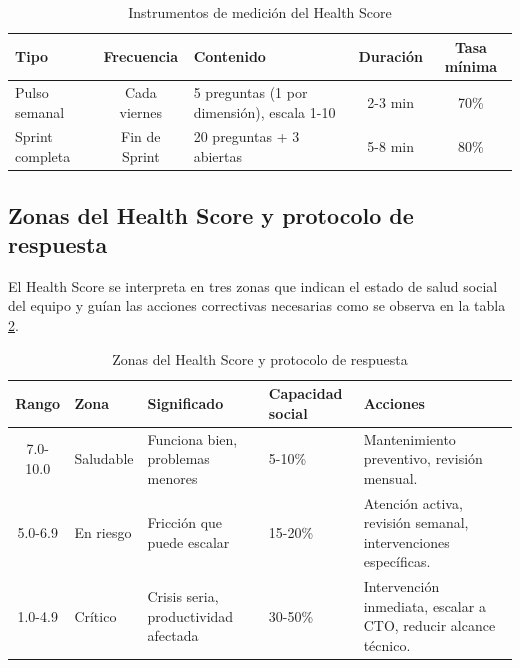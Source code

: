 \begin{table}[h]
    \centering
    \small
    \begin{tabularx}{\textwidth}{|l|c|X|c|c|}
        \hline
        \textbf{Tipo}   & \textbf{Frecuencia} & \textbf{Contenido}                         & \textbf{Duración} & \textbf{Tasa mínima} \\
        \hline
        Pulso semanal   & Cada viernes        & 5 preguntas (1 por dimensión), escala 1-10 & 2-3 min           & 70\%                 \\
        \hline
        Sprint completa & Fin de Sprint       & 20 preguntas + 3 abiertas                  & 5-8 min           & 80\%                 \\
        \hline
    \end{tabularx}
    \caption{Instrumentos de medición del Health Score}
    \label{tab:instrumentos-medicion}
\end{table}

\FloatBarrier

\subsection{Zonas del Health Score y protocolo de respuesta}

El Health Score se interpreta en tres zonas que indican el estado de salud social del equipo y guían las acciones correctivas necesarias como se observa en la tabla \ref{tab:zonas-health-score}.

\begin{table}[h]
    \centering
    \small
    \begin{tabularx}{\textwidth}{|c|l|X|X|X|}
        \hline
        \textbf{Rango} & \textbf{Zona} & \textbf{Significado}                 & \textbf{Capacidad social} & \textbf{Acciones}                                               \\
        \hline
        7.0-10.0       & Saludable     & Funciona bien, problemas menores     & 5-10\%                    & Mantenimiento preventivo, revisión mensual.                     \\
        \hline
        5.0-6.9        & En riesgo     & Fricción que puede escalar           & 15-20\%                   & Atención activa, revisión semanal, intervenciones específicas.  \\
        \hline
        1.0-4.9        & Crítico       & Crisis seria, productividad afectada & 30-50\%                   & Intervención inmediata, escalar a CTO, reducir alcance técnico. \\
        \hline
    \end{tabularx}
    \caption{Zonas del Health Score y protocolo de respuesta}
    \label{tab:zonas-health-score}
\end{table}

